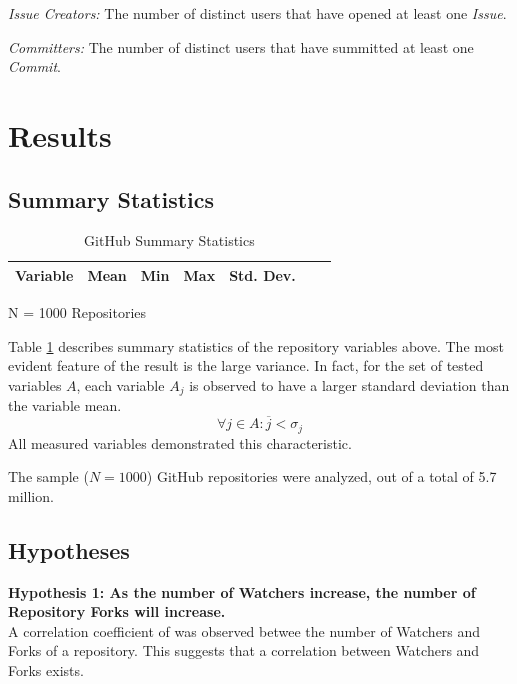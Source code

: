 \documentclass{proc}
\begin{document}
\textit{Issue Creators:}
The number of distinct users that have opened at least one \textit{Issue}.

\textit{Committers:}
The number of distinct users that have summitted at least one \textit{Commit}.

\section{Results}

\subsection{Summary Statistics}
\begin{table}[!ht]
\begin{center}
\begin{tabular}{rrrrrrr}
\hline
Variable & Mean & Min & Max & Std. Dev. \\
\hline

\hline
\end{tabular}
N = 1000 Repositories
\caption{GitHub Summary Statistics}
\label{table:summary_stats}
\end{center}
\end{table}

Table \ref{table:summary_stats} describes summary statistics of the repository variables above. The most evident feature of the result is the large variance. In fact, for the set of tested variables $A$, each variable $A_j$ is observed to have a larger standard deviation than the variable mean.
\begin{equation}
\forall j \in A \colon \overline{j} < \sigma_{j}
\label{eq:variance}
\end{equation}
All measured variables demonstrated this characteristic.

The sample ($N = 1000$) GitHub repositories were analyzed, out of a total of 5.7 million\cite{githubPress}.

\subsection{Hypotheses}
\textbf{Hypothesis 1: As the number of Watchers increase, the number of Repository Forks will increase.}\\
A correlation coefficient of  was observed betwee the number of Watchers and Forks of a repository. This suggests that a correlation between Watchers and Forks exists.
\end{document}
